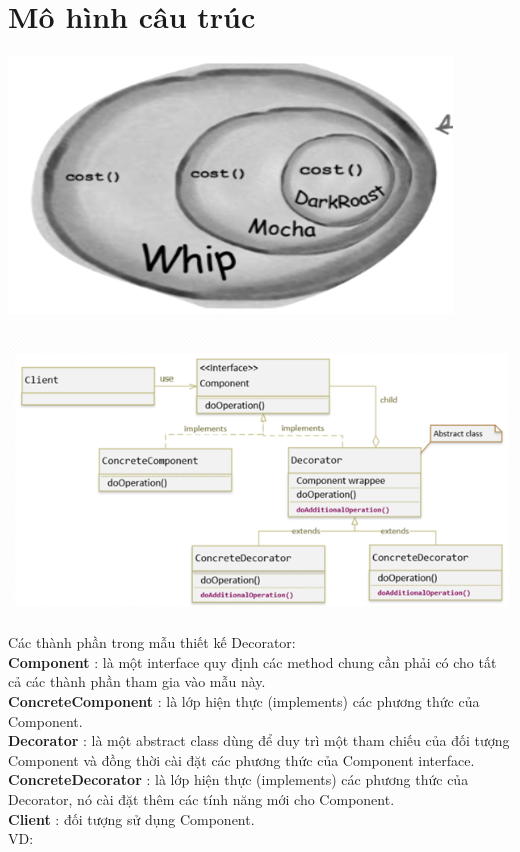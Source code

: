 \section{Mô hình câu trúc}
\begin{center}
	\includegraphics{GALLEYS/images/chapter4/diagram1}\\
\end{center}
\begin{center}
	\includegraphics{GALLEYS/images/chapter4/diagram2}\\
\end{center}
Các thành phần trong mẫu thiết kế Decorator:\\
\textbf{Component} : là một interface quy định các method chung cần phải có cho tất cả các thành phần tham gia vào mẫu này.\\
\textbf{ConcreteComponent } : là lớp hiện thực (implements) các phương thức của Component.\\
\textbf{Decorator} : là một abstract class dùng để duy trì một tham chiếu của đối tượng Component và đồng thời cài đặt các phương thức của Component  interface.\\
\textbf{ConcreteDecorator } : là lớp hiện thực (implements) các phương thức của Decorator, nó cài đặt thêm các tính năng mới cho Component.\\
\textbf{Client} : đối tượng sử dụng Component.\\
VD:\\

